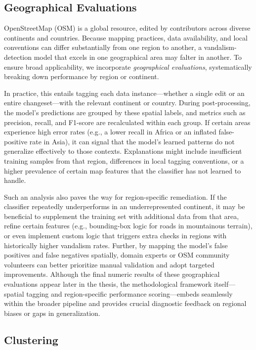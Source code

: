\documentclass[
    13pt, %
    a4paper, %
    twoside, 
    DIV14, %
    listof=totoc, %
    bibliography=totoc, %
    index=totoc, %
    headsepline
]{scrreprt}
\begin{document}
\subsection{Geographical Evaluations}
\label{sec:geographical_evaluations}

OpenStreetMap (OSM) is a global resource, edited by contributors across diverse continents and countries. Because mapping practices, data availability, and local conventions can differ substantially from one region to another, a vandalism-detection model that excels in one geographical area may falter in another. To ensure broad applicability, we incorporate \emph{geographical evaluations}, systematically breaking down performance by region or continent.

In practice, this entails tagging each data instance—whether a single edit or an entire changeset—with the relevant continent or country. During post-processing, the model’s predictions are grouped by these spatial labels, and metrics such as precision, recall, and F1-score are recalculated within each group. If certain areas experience high error rates (e.g., a lower recall in Africa or an inflated false-positive rate in Asia), it can signal that the model’s learned patterns do not generalize effectively to those contexts. Explanations might include insufficient training samples from that region, differences in local tagging conventions, or a higher prevalence of certain map features that the classifier has not learned to handle. 

Such an analysis also paves the way for region-specific remediation. If the classifier repeatedly underperforms in an underrepresented continent, it may be beneficial to supplement the training set with additional data from that area, refine certain features (e.g., bounding-box logic for roads in mountainous terrain), or even implement custom logic that triggers extra checks in regions with historically higher vandalism rates. Further, by mapping the model’s false positives and false negatives spatially, domain experts or OSM community volunteers can better prioritize manual validation and adopt targeted improvements. Although the final numeric results of these geographical evaluations appear later in the thesis, the methodological framework itself—spatial tagging and region-specific performance scoring—embeds seamlessly within the broader pipeline and provides crucial diagnostic feedback on regional biases or gaps in generalization.

\subsection{Clustering}
\label{sec:clustering}
\end{document}
